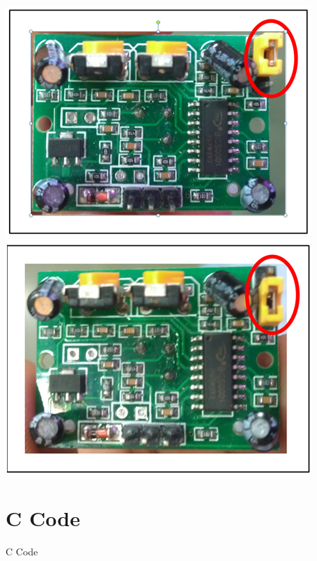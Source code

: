 \documentclass[table,10pt,red]{beamer}	%
\begin{document}
\begin{frame}
\begin{minipage}[c]{0.37\textwidth}
\hspace*{5mm}\includegraphics[width=\linewidth]{H.png}\\
\pause
\hspace*{5mm}\includegraphics[width=\linewidth]{L.png}
		\end{minipage}
\end{frame}


\section{C Code} 

\begin{frame}
	\begin{center}
\huge C Code
\end{center}
\end{frame}
\end{document}
